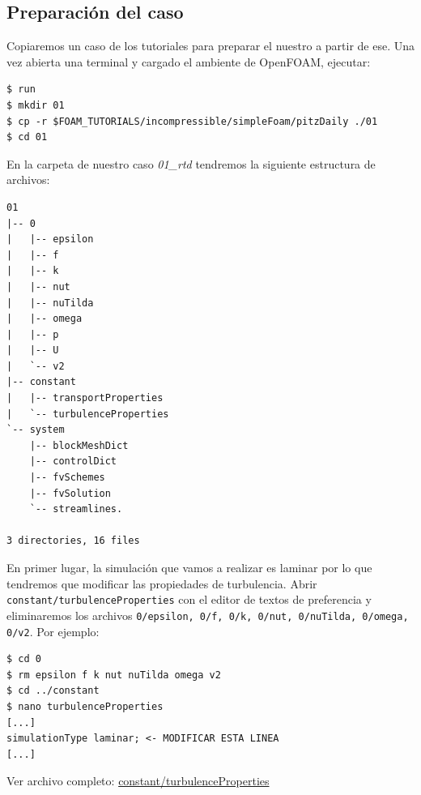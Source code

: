 \documentclass{article}
\begin{document}
\subsection{Preparación del caso}
Copiaremos un caso de los tutoriales para preparar el nuestro a partir de ese. Una vez abierta una terminal y 
cargado el ambiente de OpenFOAM, ejecutar:
\begin{lstlisting}
$ run
$ mkdir 01
$ cp -r $FOAM_TUTORIALS/incompressible/simpleFoam/pitzDaily ./01
$ cd 01
\end{lstlisting}

En la carpeta de nuestro caso \textit{01\_rtd} tendremos
la siguiente estructura de archivos:\par

\begin{lstlisting}
01
|-- 0
|   |-- epsilon
|   |-- f
|   |-- k
|   |-- nut
|   |-- nuTilda
|   |-- omega
|   |-- p
|   |-- U
|   `-- v2
|-- constant
|   |-- transportProperties
|   `-- turbulenceProperties
`-- system
    |-- blockMeshDict
    |-- controlDict
    |-- fvSchemes
    |-- fvSolution
    `-- streamlines.

3 directories, 16 files
\end{lstlisting}


En primer lugar, la simulación que vamos a realizar es laminar por lo que tendremos que modificar las propiedades de turbulencia. Abrir\\ \texttt{constant/turbulenceProperties} con el editor de textos de preferencia y eliminaremos los archivos \texttt{0/epsilon, 0/f, 0/k, 0/nut, 0/nuTilda, 0/omega, 0/v2}. Por ejemplo:\par
\begin{lstlisting}
$ cd 0
$ rm epsilon f k nut nuTilda omega v2
$ cd ../constant
$ nano turbulenceProperties
[...]
simulationType laminar; <- MODIFICAR ESTA LINEA
[...]
\end{lstlisting}

\noindent Ver archivo completo: \href{https://github.com/guillerolle/casos_cfd/blob/master/01/constant/turbulenceProperties}{constant/turbulenceProperties}
%
\end{document}
